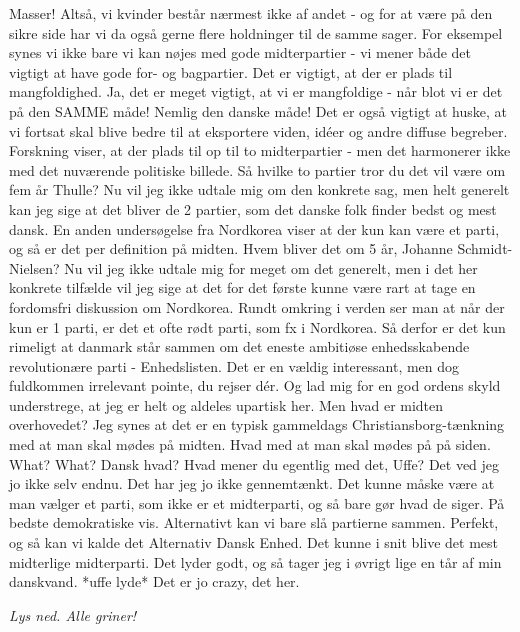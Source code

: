 \documentclass[a4paper,11pt]{article}
\begin{document}
\begin{sketch}
 Masser! Altså, vi kvinder består nærmest ikke af andet - og for at være på den sikre side har vi da også gerne flere holdninger til de samme sager. For eksempel synes vi ikke bare vi kan nøjes med gode midterpartier - vi mener både det vigtigt at have gode for- og bagpartier. Det er vigtigt, at der er plads til mangfoldighed.
 Ja, det er meget vigtigt, at vi er mangfoldige - når blot vi er det på den SAMME måde! Nemlig den danske måde!
 Det er også vigtigt at huske, at vi fortsat skal blive bedre til at eksportere viden, idéer og andre diffuse begreber.
 Forskning viser, at der plads til op til to midterpartier - men det harmonerer ikke med det nuværende politiske billede. Så hvilke to partier tror du det vil være om fem år Thulle?
 Nu vil jeg ikke udtale mig om den konkrete sag, men helt generelt kan jeg sige at det bliver de 2 partier, som det danske folk finder bedst og mest dansk.
 En anden undersøgelse fra Nordkorea viser at der kun kan være et parti, og så er det per definition på midten. Hvem bliver det om 5 år, Johanne Schmidt-Nielsen?
 Nu vil jeg ikke udtale mig for meget om det generelt, men i det her konkrete tilfælde vil jeg sige at det for det første kunne være rart at tage en fordomsfri diskussion om Nordkorea. Rundt omkring i verden ser man at når der kun er 1 parti, er det et ofte rødt parti, som fx i Nordkorea. Så derfor er det kun rimeligt at danmark står sammen om det eneste ambitiøse enhedsskabende revolutionære parti - Enhedslisten.
 Det er en vældig interessant, men dog fuldkommen irrelevant pointe, du rejser dér. Og lad mig for en god ordens skyld understrege, at jeg er helt og aldeles upartisk her.
 Men hvad er midten overhovedet? Jeg synes at det er en typisk gammeldags Christiansborg-tænkning med at man skal mødes på midten. Hvad med at man skal mødes på på siden.
 What?
 What?
 Dansk hvad?
 Hvad mener du egentlig med det, Uffe?
 Det ved jeg jo ikke selv endnu. Det har jeg jo ikke gennemtænkt. Det kunne måske være at man vælger et parti, som ikke er et midterparti, og så bare gør hvad de siger. På bedste demokratiske vis. Alternativt kan vi bare slå partierne sammen.
 Perfekt, og så kan vi kalde det Alternativ Dansk Enhed. Det kunne i snit blive det mest midterlige midterparti.
 Det lyder godt, og så tager jeg i øvrigt lige en tår af min danskvand.
 *uffe lyde* Det er jo crazy, det her.
\end{sketch}

\textit{Lys ned. Alle griner!}
\end{document}
